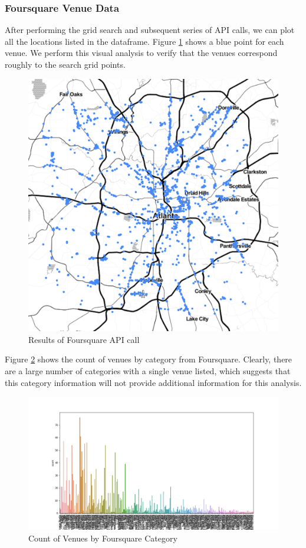 \documentclass[11pt]{amsart}
\begin{document}
\subsubsection{Foursquare Venue Data}
After performing the grid search and subsequent series of API calls, we can plot all the locations listed in the dataframe. Figure \ref{fig:venues} shows a blue point for each venue. We perform this visual analysis to verify that the venues correspond roughly to the search grid points. 
\begin{figure}[h]
\includegraphics[width=\textwidth]{VenuesMap}
\caption{Results of Foursquare API call}
\label{fig:venues}
\end{figure}

Figure \ref{fig:catcounts} shows the count of venues by category from Foursquare. Clearly, there are a large number of categories with a single venue listed, which suggests that this category information will not provide additional information for this analysis. 
\begin{figure}
\includegraphics[width=\textwidth]{catcounts}
\caption{Count of Venues by Foursquare Category}
\label{fig:catcounts}
\end{figure}
\end{document}
